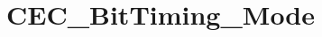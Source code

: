 \hypertarget{group___c_e_c___bit_timing___mode}{\section{C\-E\-C\-\_\-\-Bit\-Timing\-\_\-\-Mode}
\label{group___c_e_c___bit_timing___mode}
}
